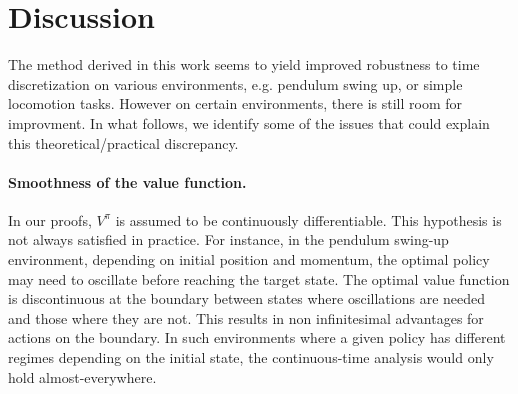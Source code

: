 \section{Discussion}
\label{sec:discussions}

The method derived in this work seems to yield improved robustness to
time discretization on various environments, e.g. pendulum swing up, or
simple locomotion tasks.  However on certain environments, there is still
room for improvment. In what follows, we identify some of the issues
that could explain this theoretical/practical discrepancy.

\paragraph{Smoothness of the value function.} In our proofs, $V^\pi$ is
assumed to be continuously differentiable.  This %
hypothesis is not always satisfied in practice. 
For instance, in the pendulum swing-up environment, depending on initial
position and momentum, the optimal policy may need to oscillate before
reaching the target state. The optimal value
function is discontinuous at the boundary between states where
oscillations are needed and those where they are not.
This results in non infinitesimal advantages
for actions on the boundary. In such environments where a given policy
has different regimes depending on the initial state, the continuous-time
analysis would only hold almost-everywhere.

